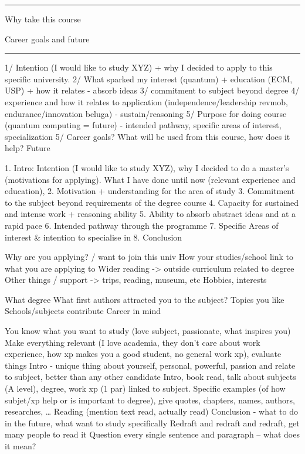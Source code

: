 \documentclass[11pt]{article}
\newcommand*{\NEWLINE}{\vspace{0.75em}}
\begin{document}
\noindent\rule{\textwidth}{1pt}

Why take this course

Career goals and future

\noindent\rule{\textwidth}{1pt}

1/ Intention (I would like to study XYZ) + why I decided to apply to this
specific university.
2/ What sparked my interest (quantum) + education (ECM, USP) + how it relates - absorb ideas
3/ commitment to subject beyond degree
4/ experience and how it relates to application (independence/leadership revmob, endurance/innovation beluga) - sustain/reasoning
5/ Purpose for doing course (quantum computing = future) - intended pathway, specific areas of interest, specialization
5/ Career goals? What will be used from this course, how does it help? Future


1. Intro: Intention (I would like to study XYZ), why I decided to do a master’s (motivations for applying). What I have done until now (relevant experience and education), 
2. Motivation + understanding for the area of study
3. Commitment to the subject beyond requirements of the degree course
4. Capacity for sustained and intense work + reasoning ability
5. Ability to absorb abstract ideas and at a rapid pace
6. Intended pathway through the programme
7. Specific Areas of interest \& intention to specialise in
8. Conclusion
\NEWLINE{}


Why are you applying? / want to join this univ
How your studies/school link to what you are applying to
Wider reading -> outside curriculum related to degree
Other things / support -> trips, reading, museum, etc
Hobbies, interests \NEWLINE{}

What degree
What first authors attracted you to the subject?
Topics you like
Schools/subjects contribute
Career in mind \NEWLINE{}

You know what you want to study (love subject, passionate, what inspires you) 
Make everything relevant (I love academia, they don’t care about work experience, how xp makes you a good student, no general work xp), evaluate things
Intro - unique thing about yourself, personal, powerful, passion and relate to subject, better than any other candidate
Intro, book read, talk about subjects (A level), degree, work xp (1 par) linked to subject.
Specific examples (of how subjet/xp help or is important to degree), give quotes, chapters, names, authors, researches, … 
Reading (mention text read, actually read)
Conclusion - what to do in the future, what want to study specifically
Redraft and redraft and redraft, get many people to read it
Question every single sentence and paragraph -- what does it mean?
\NEWLINE{}
\end{document}
